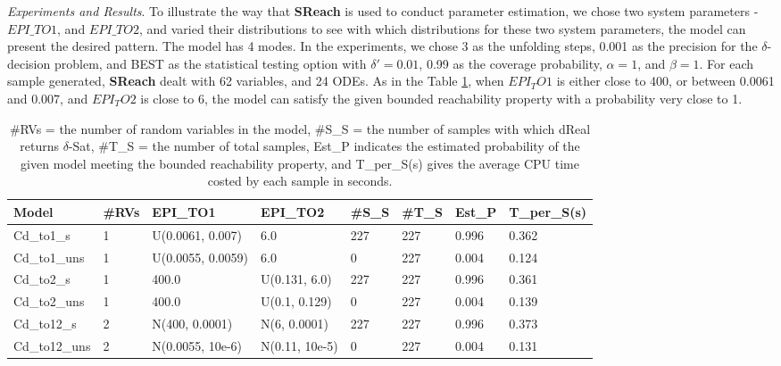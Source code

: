 \documentclass[runningheads,a4paper]{llncs}
\begin{document}
\textit{Experiments and Results}. To illustrate the way that {\bf SReach} is used to conduct parameter estimation, we chose two system parameters - $EPI\_TO1$, and $EPI\_TO2$, and varied their distributions to see with which distributions for these two system parameters, the model can present the desired pattern. The model has 4 modes. In the experiments, we chose 3 as the unfolding steps, 0.001 as the precision for the $\delta$-decision problem, and BEST as the statistical testing option with $\delta' = 0.01$, 0.99 as the coverage probability, $\alpha = 1$, and $\beta = 1$. For each sample generated, {\bf SReach} dealt with 62 variables, and 24 ODEs. As in the Table \ref{table:cardiac}, when $EPI_TO1$ is either close to 400, or between 0.0061 and 0.007, and $EPI_TO2$ is close to 6, the model can satisfy the given bounded reachability property with a probability very close to 1. 

\begin{table}[h]
    \begin{tabular}{|l|l|l|l|l|l|l|l|}
    \hline
    Model         & \#RVs & EPI\_TO1            & EPI\_TO2         & \#S\_S & \#T\_S & Est\_P & T\_per\_S(s) \\ \hline
    Cd\_to1\_s    & 1     & U(0.0061, 0.007)    & 6.0              & 227       & 227      & 0.996     & 0.362        \\ \hline
    Cd\_to1\_uns  & 1     & U(0.0055, 0.0059)   & 6.0              & 0         & 227      & 0.004     & 0.124        \\ \hline
    Cd\_to2\_s    & 1     & 400.0               & U(0.131, 6.0)    & 227       & 227      & 0.996     & 0.361        \\ \hline
    Cd\_to2\_uns  & 1     & 400.0               & U(0.1, 0.129)    & 0         & 227      & 0.004     & 0.139        \\ \hline
    Cd\_to12\_s   & 2     & N(400, 0.0001)      & N(6, 0.0001)     & 227       & 227      & 0.996     & 0.373        \\ \hline
    Cd\_to12\_uns & 2     & N(0.0055, 10e-6) & N(0.11, 10e-5) & 0         & 227      & 0.004     & 0.131        \\ \hline
    \end{tabular}
    \caption { \#RVs = the number of random variables in the model, \#S\_S = the number of samples with which dReal returns $\delta$-Sat, \#T\_S = the number of total samples, Est\_P indicates the estimated probability of the given model meeting the bounded reachability property, and T\_per\_S(s) gives the average CPU time costed by each sample in seconds.}
    \label{table:cardiac}
\end{table}
\end{document}
